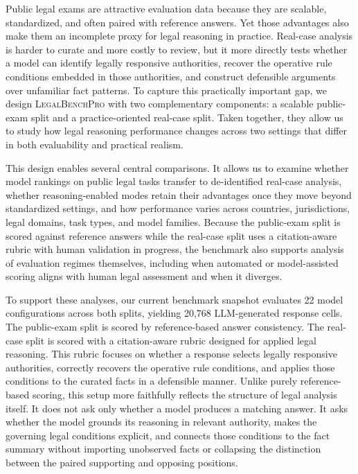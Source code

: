 Public legal exams are attractive evaluation data because they are scalable,
standardized, and often paired with reference answers. Yet those advantages also make
them an incomplete proxy for legal reasoning in practice. Real-case analysis is
harder to curate and more costly to review, but it more directly tests whether a
model can identify legally responsive authorities, recover the operative rule
conditions embedded in those authorities, and construct defensible arguments over
unfamiliar fact patterns. To capture this practically important gap, we design
\textsc{LegalBenchPro} with two complementary components: a scalable public-exam
split and a practice-oriented real-case split. Taken together, they allow us to study
how legal reasoning performance changes across two settings that differ in both
evaluability and practical realism.

This design enables several central comparisons. It allows us to examine whether
model rankings on public legal tasks transfer to de-identified real-case analysis,
whether reasoning-enabled modes retain their advantages once they move beyond
standardized settings, and how performance varies across countries, jurisdictions,
legal domains, task types, and model families. Because the public-exam split is
scored against reference answers while the real-case split uses a citation-aware
rubric with human validation in progress, the benchmark also supports analysis of
evaluation regimes themselves, including when automated or model-assisted scoring
aligns with human legal assessment and when it diverges.

To support these analyses, our current benchmark snapshot evaluates 22 model
configurations across both splits, yielding 20,768 LLM-generated response cells.
The public-exam split is scored by
reference-based answer consistency. The real-case split is scored with a
citation-aware rubric designed for applied legal reasoning. This rubric focuses on
whether a response selects legally responsive authorities, correctly recovers the
operative rule conditions, and applies those conditions to the curated facts in a
defensible manner. Unlike purely reference-based scoring, this setup more faithfully
reflects the structure of legal analysis itself. It does not ask only whether a model
produces a matching answer. It asks whether the model grounds its reasoning in
relevant authority, makes the governing legal conditions explicit, and connects those
conditions to the fact summary without importing unobserved facts or collapsing the
distinction between the paired supporting and opposing positions.

